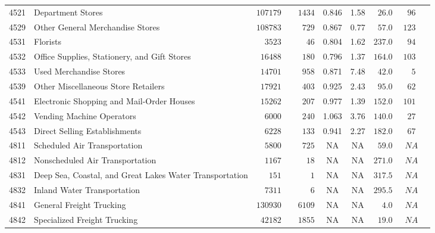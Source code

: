 \documentclass[9pt, oneside]{article}   	%
\begin{document}
\begin{longtable}{lp{3 in}ccccccc}
4521  & Department Stores & $107179$ & $\phantom{00}1434$ & 0.846 &  1.58 & $\phantom{0}26.0$ & $\phantom{0}96$ \\
4529  & Other General Merchandise Stores & $108783$ & $\phantom{000}729$ & 0.867 &  0.77 & $\phantom{0}57.0$ & $123$ \\
4531  & Florists & $\phantom{00}3523$ & $\phantom{0000}46$ & 0.804 &  1.62 & $237.0$ & $\phantom{0}94$ \\
4532  & Office Supplies, Stationery, and Gift Stores & $\phantom{0}16488$ & $\phantom{000}180$ & 0.796 &  1.37 & $164.0$ & $103$ \\
4533  & Used Merchandise Stores & $\phantom{0}14701$ & $\phantom{000}958$ & 0.871 &  7.48 & $\phantom{0}42.0$ & $\phantom{00}5$ \\
4539  & Other Miscellaneous Store Retailers & $\phantom{0}17921$ & $\phantom{000}403$ & 0.925 &  2.43 & $\phantom{0}95.0$ & $\phantom{0}62$ \\
4541  & Electronic Shopping and Mail-Order Houses & $\phantom{0}15262$ & $\phantom{000}207$ & 0.977 &  1.39 & $152.0$ & $101$ \\
4542  & Vending Machine Operators & $\phantom{00}6000$ & $\phantom{000}240$ & 1.063 &  3.76 & $140.0$ & $\phantom{0}27$ \\
4543  & Direct Selling Establishments & $\phantom{00}6228$ & $\phantom{000}133$ & 0.941 &  2.27 & $182.0$ & $\phantom{0}67$ \\
4811  & Scheduled Air Transportation & $\phantom{00}5800$ & $\phantom{000}725$ &    NA &    NA & $\phantom{0}59.0$ & $\phantom{0}NA$ \\
4812  & Nonscheduled Air Transportation & $\phantom{00}1167$ & $\phantom{0000}18$ &    NA &    NA & $271.0$ & $\phantom{0}NA$ \\
4831  & Deep Sea, Coastal, and Great Lakes Water Transportation & $\phantom{000}151$ & $\phantom{00000}1$ &    NA &    NA & $317.5$ & $\phantom{0}NA$ \\
4832  & Inland Water Transportation & $\phantom{00}7311$ & $\phantom{00000}6$ &    NA &    NA & $295.5$ & $\phantom{0}NA$ \\

4841  & General Freight Trucking & $130930$ & $\phantom{00}6109$ &    NA &    NA & $\phantom{00}4.0$ & $\phantom{0}NA$ \\
4842  & Specialized Freight Trucking & $\phantom{0}42182$ & $\phantom{00}1855$ &    NA &    NA & $\phantom{0}19.0$ & $\phantom{0}NA$ \\


\end{longtable}
\end{document}
